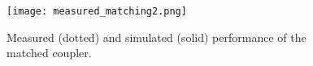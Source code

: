\documentclass[journal]{IEEEtran}
\begin{document}
\begin{figure}
	\texttt{[image: measured\_matching2.png]}
	\caption{Measured (dotted) and simulated (solid) performance of the matched coupler.}
	\label{measurement2}
\end{figure}

%
%



%
%
\end{document}
